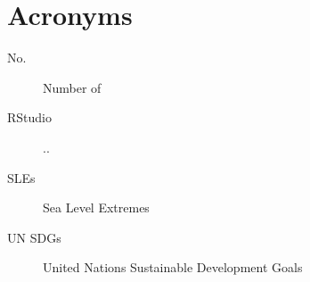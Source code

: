 
\chapter{Acronyms}
\begin{description}
\item[No.] Number of
\item [RStudio] ..
\item[SLEs] Sea Level Extremes
\item [UN SDGs] United Nations Sustainable Development Goals 
\end{description}